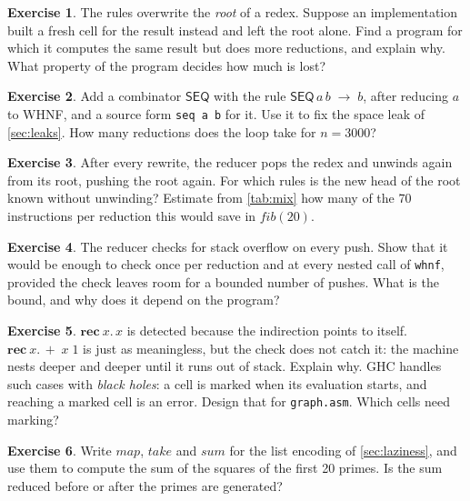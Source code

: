 \documentclass[11pt,a4paper]{article}
\newcommand{\cmb}[1]{\textsf{#1}}
\newcommand{\red}{\;\to\;}
\theoremstyle{definition}
\newtheorem{exercise}{Exercise}
\theoremstyle{plain}
\begin{document}
\begin{exercise}
The rules overwrite the \emph{root} of a redex. Suppose an implementation
built a fresh cell for the result instead and left the root alone. Find a
program for which it computes the same result but does more reductions, and
explain why. What property of the program decides how much is lost?
\end{exercise}

\begin{exercise}\label{ex:seq}
Add a combinator $\cmb{SEQ}$ with the rule $\cmb{SEQ}\,a\,b \red b$, after
reducing $a$ to WHNF, and a source form \texttt{seq a b} for it. Use it to fix
the space leak of \cref{sec:leaks}. How many reductions does the loop take
for $n = 3000$?
\end{exercise}

\begin{exercise}
After every rewrite, the reducer pops the redex and unwinds again from its
root, pushing the root again. For which rules is the new head of the root
known without unwinding? Estimate from \cref{tab:mix} how many of the 70
instructions per reduction this would save in $\mathit{fib}(20)$.
\end{exercise}

\begin{exercise}
The reducer checks for stack overflow on every push. Show that it would be
enough to check once per reduction and at every nested call of
\texttt{whnf}, provided the check leaves room for a bounded number of pushes.
What is the bound, and why does it depend on the program?
\end{exercise}

\begin{exercise}
$\mathbf{rec}\ x.\,x$ is detected because the indirection points to itself.
$\mathbf{rec}\ x.\,{+}\;x\;1$ is just as meaningless, but the check does not
catch it: the machine nests deeper and deeper until it runs out of stack.
Explain why. GHC handles such cases with \emph{black holes}: a cell is marked
when its evaluation starts, and reaching a marked cell is an error. Design
that for \texttt{graph.asm}. Which cells need marking?
\end{exercise}

\begin{exercise}
Write $\mathit{map}$, $\mathit{take}$ and $\mathit{sum}$ for the list
encoding of \cref{sec:laziness}, and use them to compute the sum of the
squares of the first 20 primes. Is the sum reduced before or after the
primes are generated?
\end{exercise}
\end{document}
